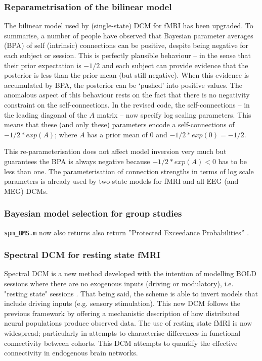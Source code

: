 \documentclass[a4paper,titlepage,openany]{article}
\begin{document}
\begin{multicols}{2}
\subsubsection{Reparametrisation of the bilinear model}

The bilinear model used by (single-state) DCM for fMRI has been upgraded. To summarise, a number of people have observed that Bayesian parameter averages (BPA) of self (intrinsic) connections can be positive, despite being negative for each subject or session. This is perfectly plausible behaviour -- in the sense that their prior expectation is $-1/2$ and each subject can provide evidence that the posterior is less than the prior mean (but still negative). When this evidence is accumulated by BPA, the posterior can be `pushed' into positive values. The anomalous aspect of this behaviour rests on the fact that there is no negativity constraint on the self-connections.  In the revised code, the self-connections -- in the leading diagonal of the $A$ matrix -- now specify log scaling parameters. This means that these (and only these) parameters encode a self-connections of $-1/2*exp(A)$; where $A$ has a prior mean of $0$ and $-1/2*exp(0) = -1/2$.

This re-parameterisation does not affect model inversion very much but guarantees the BPA is always negative because $-1/2*exp(A) < 0$ has to be less than one. The parameterisation of connection strengths in terms of log scale parameters is already used by two-state models for fMRI and all EEG (and MEG) DCMs.

\subsubsection{Bayesian model selection for group studies}

\texttt{spm\_BMS.m} now also returns also return ''Protected Exceedance Probabilities'' \cite{Rigoux2014}.

\subsubsection{Spectral DCM for resting state fMRI}

Spectral DCM is a new method developed with the intention of modelling BOLD sessions where there are no exogenous inputs (driving or modulatory), i.e. "resting state" sessions \cite{rsDCM2014}. That being said, the scheme is able to invert models that include driving inputs (e.g. sensory stimulation). This new DCM follows the previous framework by offering a mechanistic description of how distributed neural populations produce observed data. The use of resting state fMRI is now widespread; particularly in attempts to characterise differences in functional connectivity between cohorts. This DCM attempts to quantify the effective connectivity in endogenous brain networks.


\end{multicols}
\end{document}
